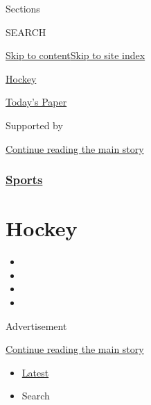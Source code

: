 Sections

SEARCH

\protect\hyperlink{site-content}{Skip to
content}\protect\hyperlink{site-index}{Skip to site index}

\href{https://www.nytimes.com/section/sports/hockey}{Hockey}

\href{https://myaccount.nytimes.com/auth/login?response_type=cookie\&client_id=vi}{}

\href{https://www.nytimes.com/section/todayspaper}{Today's Paper}

Supported by

\protect\hyperlink{after-sponsor}{Continue reading the main story}

\hypertarget{sports}{%
\subsubsection{\texorpdfstring{\href{/section/sports}{Sports}}{Sports}}\label{sports}}

\hypertarget{hockey}{%
\section{Hockey}\label{hockey}}

\begin{itemize}
\item
\item
\item
\item
\end{itemize}

Advertisement

\protect\hyperlink{after-subheader}{Continue reading the main story}

\begin{itemize}
\tightlist
\item
  \protect\hyperlink{stream-panel}{Latest}
\item
  Search
\end{itemize}

